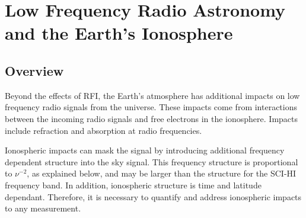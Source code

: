 \chapter{Low Frequency Radio Astronomy and the Earth's Ionosphere}\label{Ch:Iono}


\section{Overview}

Beyond the effects of RFI, the Earth's atmosphere has additional impacts on low frequency radio signals from the universe. These impacts come from interactions between the incoming radio signals and free electrons in the ionosphere. Impacts include refraction and absorption at radio frequencies. 

Ionospheric impacts can mask the \cm signal by introducing additional frequency dependent structure into the sky signal. This frequency structure is proportional to $\nu^{-2}$, as explained below, and may be larger than the \cm structure for the SCI-HI frequency band. In addition, ionospheric structure is time and latitude dependant. Therefore, it is necessary to quantify and address ionospheric impacts to any \cm measurement. 


